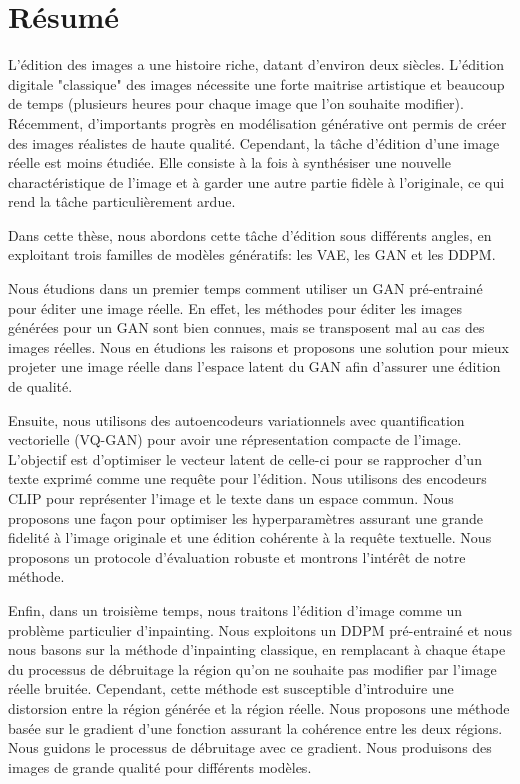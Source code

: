 \cleardoublepage


\chapter{R\'esum\'e}


L'édition des images a une histoire riche, datant d'environ deux siècles. 
L'édition digitale "classique" des images nécessite une forte maitrise artistique
et beaucoup de temps (plusieurs heures pour chaque image que l'on souhaite modifier).
Récemment, d'importants progrès en modélisation générative ont 
permis de créer des images réalistes de haute qualité. Cependant, la tâche d'édition 
d'une image réelle est moins étudiée. Elle consiste à la fois à synthésiser une nouvelle charactéristique de 
l'image et à garder une autre partie fidèle à l'originale, ce qui rend la tâche 
particulièrement ardue.

Dans cette thèse, nous abordons cette tâche d'édition sous différents angles, en exploitant 
trois familles de modèles génératifs: les \ac{VAE}, les \ac{GAN} et les \ac{DDPM}.

Nous étudions  dans un premier temps comment utiliser un \ac{GAN} pré-entrainé pour éditer 
une image réelle. En effet, les méthodes pour éditer les images générées pour un \ac{GAN} sont 
bien connues, mais se transposent mal au cas des images réelles. Nous en étudions les raisons 
 et proposons une solution pour mieux projeter une image réelle dans l'espace latent du \ac{GAN} 
afin d'assurer une édition de qualité.

Ensuite, nous utilisons des autoencodeurs variationnels avec quantification 
vectorielle (VQ-GAN) pour avoir une répresentation compacte de l'image. 
L'objectif est d'optimiser le vecteur latent de celle-ci pour se rapprocher 
d'un texte exprimé comme une requête pour l'édition. 
Nous utilisons des encodeurs CLIP  pour représenter l'image et le texte dans un espace commun.
Nous proposons une façon pour optimiser 
les hyperparamètres assurant une grande fidelité à l'image originale et une édition cohérente à la requête textuelle. 
Nous proposons
un protocole d'évaluation robuste et montrons l'intérêt de notre méthode.

Enfin, dans un troisième temps, nous traitons l'édition d'image comme un problème 
particulier d'inpainting. Nous exploitons un \ac{DDPM} pré-entrainé 
et nous nous basons sur la méthode d'inpainting classique, en remplacant à chaque étape 
du processus de débruitage la région qu'on ne souhaite pas modifier par l'image réelle bruitée.
Cependant, cette méthode est susceptible d'introduire une distorsion entre la région 
générée et la région réelle. Nous proposons une méthode basée sur le gradient 
d'une fonction assurant la cohérence entre les deux régions. Nous guidons le 
processus de débruitage avec ce gradient. Nous produisons des images de grande qualité pour différents modèles.









